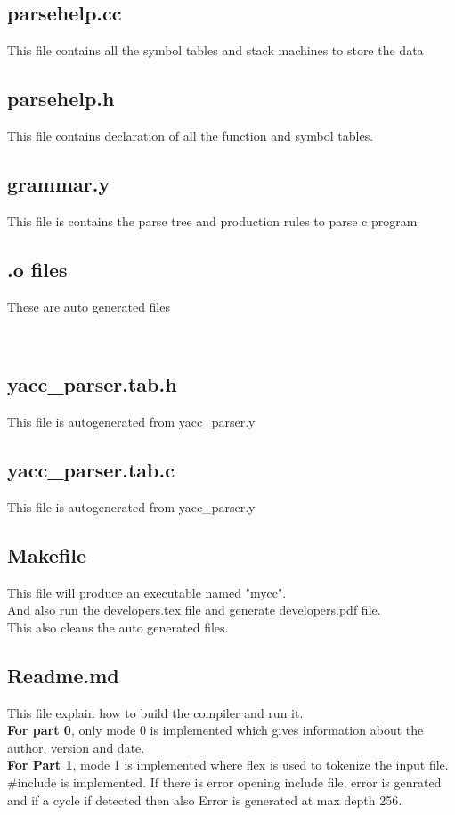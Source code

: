 \documentclass{article}
\begin{document}
\subsection*{parsehelp.cc}
This file contains all the symbol tables and stack machines to store the data\\

\subsection*{parsehelp.h}
This file contains declaration of all the function and symbol tables.\\

\subsection*{grammar.y}
This file is contains the parse tree and production rules to parse c program\\

\subsection*{.o files}
These are auto generated files

\

\subsection*{yacc\_parser.tab.h}
This file is autogenerated from yacc\_parser.y \\

\subsection*{yacc\_parser.tab.c}
This file is autogenerated from yacc\_parser.y \\

\subsection*{Makefile}
This file will produce an executable named "mycc". \\
And also run the developers.tex file and generate developers.pdf file. \\
This also cleans the auto generated files. \\

\subsection*{Readme.md}
This file explain how to build the compiler and run it. \\
{ \bf For part 0}, only mode 0 is implemented which gives information about the author, version and date. \\
{ \bf For Part 1},  mode 1 is implemented where flex is used to tokenize the input file. \\
$\#$include is implemented.
If there is error opening include file, error is genrated and if a cycle if detected then also Error is generated at max depth 256. \\
\end{document}
